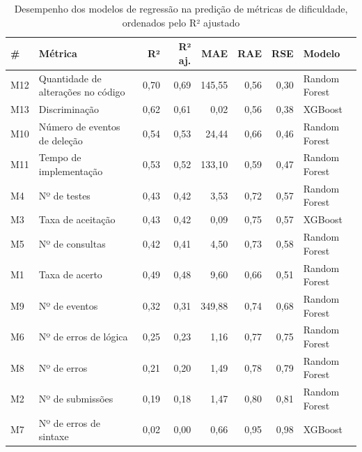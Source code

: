 \documentclass[12pt]{article}
\begin{document}
\begin{table}[h!]
    \centering
    \footnotesize
    \renewcommand{\arraystretch}{1.1}
    \setlength{\tabcolsep}{4pt}
    \caption{Desempenho dos modelos de regressão na predição de métricas de dificuldade, ordenados pelo R² ajustado}
    \label{tab:tabela_regressao}
    \begin{tabular}{@{}llrrrrrl@{}}
        \toprule
        \textbf{\#} & \textbf{Métrica} & \textbf{R²} & \textbf{R² aj.} & \textbf{MAE} & \textbf{RAE} & \textbf{RSE} & \textbf{Modelo} \\
        \midrule
        M12 & Quantidade de alterações no código & 0,70 & 0,69 & 145,55 & 0,56 & 0,30 & Random Forest \\
        M13 & Discriminação & 0,62 & 0,61 & 0,02 & 0,56 & 0,38 & XGBoost \\
        M10 & Número de eventos de deleção & 0,54 & 0,53 & 24,44 & 0,66 & 0,46 & Random Forest \\
        M11 & Tempo de implementação & 0,53 & 0,52 & 133,10 & 0,59 & 0,47 & Random Forest \\
        M4 & Nº de testes & 0,43 & 0,42 & 3,53 & 0,72 & 0,57 & Random Forest \\
        M3 & Taxa de aceitação & 0,43 & 0,42 & 0,09 & 0,75 & 0,57 & XGBoost \\
        M5 & Nº de consultas & 0,42 & 0,41 & 4,50 & 0,73 & 0,58 & Random Forest \\
        M1 & Taxa de acerto & 0,49 & 0,48 & 9,60 & 0,66 & 0,51 & Random Forest \\
        M9 & Nº de eventos & 0,32 & 0,31 & 349,88 & 0,74 & 0,68 & Random Forest \\
        M6 & Nº de erros de lógica & 0,25 & 0,23 & 1,16 & 0,77 & 0,75 & Random Forest \\
        M8 & Nº de erros & 0,21 & 0,20 & 1,49 & 0,78 & 0,79 & Random Forest \\
        M2 & Nº de submissões & 0,19 & 0,18 & 1,47 & 0,80 & 0,81 & Random Forest \\
        M7 & Nº de erros de sintaxe & 0,02 & 0,00 & 0,66 & 0,95 & 0,98 & XGBoost \\
        \bottomrule
    \end{tabular}
\end{table}
\end{document}
